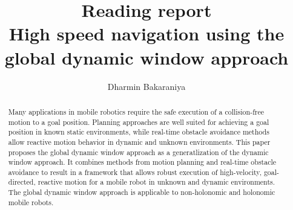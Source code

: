 \documentclass[12pt]{article}
\title{Reading report\\High speed navigation using the global dynamic window approach\cite{brook1999high}}
\author{Dharmin Bakaraniya}
\begin{document}
\maketitle{}

\begin{abstract}
Many applications in mobile robotics require the
safe execution of a collision-free motion to a goal position. Planning approaches are well suited for achieving a goal position in known static environments,
while real-time obstacle avoidance methods allow reactive motion behavior in dynamic and unknown environments. 
This paper proposes the global dynamic window approach as a generatlization of the dynamic window approach. 
It combines methods from motion planning and real-time obstacle avoidance to result
in a framework that allows robust execution of high-velocity, goal-directed, reactive motion for a mobile
robot in unknown and dynamic environments. The
global dynamic window approach is applicable to non-holonomic and holonomic mobile robots.
\end{abstract}
\end{document}
